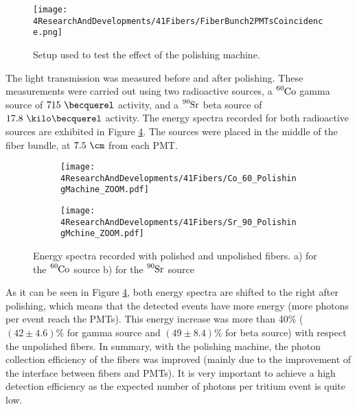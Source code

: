 \begin{figure}[]
\centering
\texttt{[image: 4ResearchAndDevelopments/41Fibers/FiberBunch2PMTsCoincidence.png]}
\caption{Setup used to test the effect of the polishing machine.\label{fig:BunchWith2PMTsCoincidence}}
\end{figure}

The light transmission was measured before and after polishing. These measurements were carried out using two radioactive sources, a $\ce{^{60}Co}$ gamma source of $715~\becquerel$ activity, and a $\ce{^{90}Sr}$ beta source of $17.8~\kilo\becquerel$ activity. The energy spectra recorded for both radioactive sources are exhibited in Figure \ref{fig:ResultsOfPolishingMachine}. The sources were placed in the middle of the fiber bundle, at $7.5~\cm$ from each PMT.

\begin{figure}
\centering
    \begin{subfigure}[b]{1\textwidth}
    \centering
    \texttt{[image: 4ResearchAndDevelopments/41Fibers/Co\_60\_PolishingMachine\_ZOOM.pdf]}  
    \caption{\label{subfig:EnergySpectrumCo60PolishingTest}}
    \end{subfigure}
    \hfill
    \begin{subfigure}[b]{1\textwidth}
    \centering
    \texttt{[image: 4ResearchAndDevelopments/41Fibers/Sr\_90\_PolishingMchine\_ZOOM.pdf]}  
    \caption{\label{subfig:EnergySpectrumSr90PolishingTest}}
    \end{subfigure}
 \caption{Energy spectra recorded with polished and unpolished fibers. a) for the $\ce{^{60}Co}$ source b) for the $\ce{^{90}Sr}$ source}
 \label{fig:ResultsOfPolishingMachine}
\end{figure}

As it can be seen in Figure \ref{fig:ResultsOfPolishingMachine}, both energy spectra are shifted to the right after polishing, which means that the detected events have more energy (more photons per event reach the PMTs). This energy increase was more than 40\% ($(42 \pm 4.6)\%$ for gamma source and $(49 \pm 8.4)\%$ for beta source) with respect the unpolished fibers. In summary, with the polishing machine, the photon collection efficiency of the fibers was improved  (mainly due to the improvement of the interface between fibers and PMTs). It is very important to achieve a high detection efficiency as the expected number of photons per tritium event is quite low.